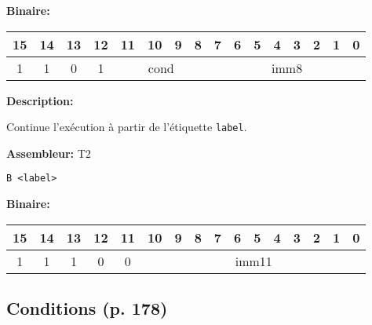 \documentclass{article}
\begin{document}
    \textbf{Binaire:}

    \begin{tabular}{| c c c c c c c c c c c c c c c c |}
        \hline
        15 & 14 & 13 & 12 & \multicolumn{1}{|c}{11} & 10 & 9 & 8 & \multicolumn{1}{|c}{7} & 6 & 5 & 4 & 3 & 2 & 1 & 0 \\
        \hline
        1 & 1 & 0 & 1 & \multicolumn{4}{|c}{cond} & \multicolumn{8}{|c|}{imm8} \\
        \hline
    \end{tabular}

    \label{subsubsubsec:CondBranch}


    \textbf{Description: }

    Continue l'exécution à partir de l'étiquette \texttt{label}.

    \textbf{Assembleur:} T2

    \begin{lstlisting}
B <label>
    \end{lstlisting}

    \textbf{Binaire:}

    \begin{tabular}{| c c c c c c c c c c c c c c c c |}
        \hline
        15 & 14 & 13 & 12 & 11 & \multicolumn{1}{|c}{10} & 9 & 8 & 7 & 6 & 5 & 4 & 3 & 2 & 1 & 0 \\
        \hline
        1 & 1 & 1 & 0 & 0 & \multicolumn{11}{|c|}{imm11} \\
        \hline
    \end{tabular}

    \subsection{Conditions (p. 178)}
    \label{subsec:CondFlags}
\end{document}
